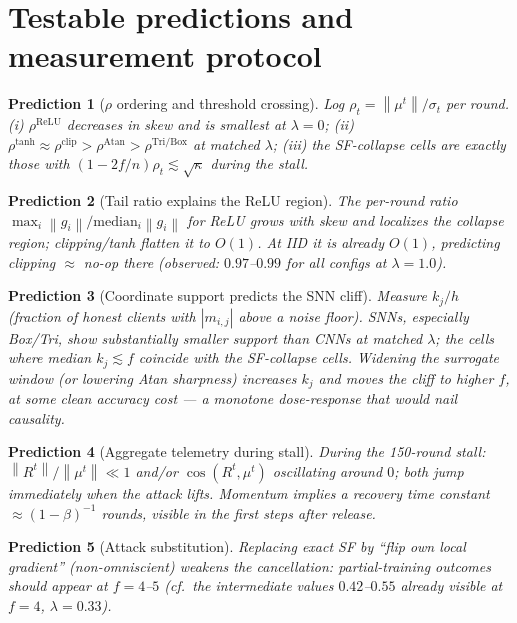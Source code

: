 \documentclass[11pt]{article}
\newtheorem{prediction}{Prediction}
\newcommand{\norm}[1]{\left\lVert #1 \right\rVert}
\begin{document}
\section{Testable predictions and measurement protocol}

\begin{prediction}[$\rho$ ordering and threshold crossing]
Log $\rho_t = \norm{\mu^t}/\sigma_t$ per round. (i) $\rho^{\mathrm{ReLU}}$
decreases in skew and is smallest at $\lambda = 0$; (ii)
$\rho^{\mathrm{tanh}} \approx \rho^{\mathrm{clip}} >
\rho^{\mathrm{Atan}} > \rho^{\mathrm{Tri/Box}}$ at matched $\lambda$;
(iii) the SF-collapse cells are exactly those with
$(1-2f/n)\rho_t \lesssim \sqrt{\kappa}$ during the stall.
\end{prediction}

\begin{prediction}[Tail ratio explains the ReLU region]
The per-round ratio $\max_i \norm{g_i}/\mathrm{median}_i\norm{g_i}$ for ReLU
grows with skew and localizes the collapse region; clipping/tanh flatten it to
$O(1)$. At IID it is already $O(1)$, predicting clipping $\approx$ no-op there
(observed: $0.97$--$0.99$ for all configs at $\lambda = 1.0$).
\end{prediction}

\begin{prediction}[Coordinate support predicts the SNN cliff]
Measure $k_j/h$ (fraction of honest clients with $|m_{i,j}|$ above a noise
floor). SNNs, especially Box/Tri, show substantially smaller support than CNNs
at matched $\lambda$; the cells where median $k_j \lesssim f$ coincide with
the SF-collapse cells. Widening the surrogate window (or lowering Atan
sharpness) increases $k_j$ and moves the cliff to higher $f$, at some clean
accuracy cost --- a monotone dose-response that would nail causality.
\end{prediction}

\begin{prediction}[Aggregate telemetry during stall]
During the 150-round stall: $\norm{R^t}/\norm{\mu^t} \ll 1$ and/or
$\cos(R^t, \mu^t)$ oscillating around $0$; both jump immediately when the
attack lifts. Momentum implies a recovery time constant $\approx (1-\beta)^{-1}$
rounds, visible in the first steps after release.
\end{prediction}

\begin{prediction}[Attack substitution]
Replacing exact SF by ``flip own local gradient'' (non-omniscient) weakens the
cancellation: partial-training outcomes should appear at $f{=}4$--$5$
(cf.\ the intermediate values $0.42$--$0.55$ already visible at $f{=}4$,
$\lambda{=}0.33$).
\end{prediction}
\end{document}
